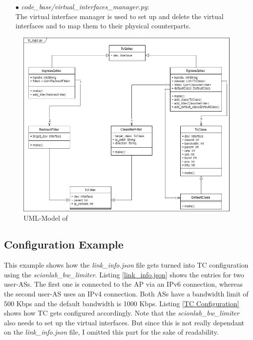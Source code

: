 \begin{enumerate}
\item[$\bullet$]\textit{code\_base/virtual\_interfaces\_manager.py}:
\\
The virtual interface manager is used to set up and delete the virtual interfaces and to map them to their physical counterparts.

\end{enumerate}

\begin{figure}[h]
	\centering
  	\includegraphics[width=\textwidth]{img/tc_logic_uml.png}
    \caption{UML-Model of }
    \label{tc logic uml}
\end{figure}

\newpage
\textit{ }
\newpage
\subsection{Configuration Example}

This example shows how the \textit{link\_info.json} file gets turned into \acs{TC} configuration using the \textit{scionlab\_bw\_limiter}. Listing \ref{link_info.json} shows the entries for two user-\acsp{AS}.  The first one is connected to the \acs{AP} via an \acs{IP}v6 connection, whereas the second user-\acs{AS} uses an \acs{IP}v4 connection. Both \acsp{AS} have a bandwidth limit of 500 Kbps and the default bandwidth is 1000 Kbps. Listing \ref{TC Configuration} shows how \acs{TC} gets configured accordingly. Note that the \textit{scionlab\_bw\_limiter} also needs to set up the virtual interfaces. But since this is not really dependant on the \textit{link\_info.json} file, I omitted this part for the sake of readability. 

